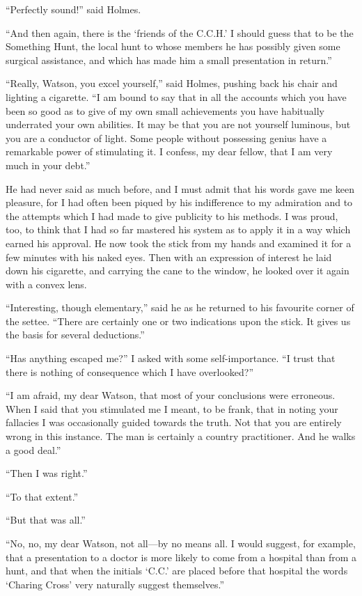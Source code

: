 \documentclass[paper=5.5in:8.5in,BCOR=7mm,twoside,DIV=calc,12pt,usegeometry,openany,chapterprefix,endperiod]{scrbook} %
\begin{document}
\enquote{Perfectly sound!} said Holmes.

\enquote{And then again, there is the \enquote{friends of the C.C.H.} I should guess that to be the Something Hunt, the local hunt to whose members he has possibly given some surgical assistance, and which has made him a small presentation in return.}

\enquote{Really, Watson, you excel yourself,} said Holmes, pushing back his chair and lighting a cigarette. \enquote{I am bound to say that in all the accounts which you have been so good as to give of my own small achievements you have habitually underrated your own abilities. It may be that you are not yourself luminous, but you are a conductor of light. Some people without possessing genius have a remarkable power of stimulating it. I confess, my dear fellow, that I am very much in your debt.}

He had never said as much before, and I must admit that his words gave me keen pleasure, for I had often been piqued by his indifference to my admiration and to the attempts which I had made to give publicity to his methods. I was proud, too, to think that I had so far mastered his system as to apply it in a way which earned his approval. He now took the stick from my hands and examined it for a few minutes with his naked eyes. Then with an expression of interest he laid down his cigarette, and carrying the cane to the window, he looked over it again with a convex lens.

\enquote{Interesting, though elementary,} said he as he returned to his favourite corner of the settee. \enquote{There are certainly one or two indications upon the stick. It gives us the basis for several deductions.}

\enquote{Has anything escaped me?} I asked with some self-importance. \enquote{I trust that there is nothing of consequence which I have overlooked?}

\enquote{I am afraid, my dear Watson, that most of your conclusions were erroneous. When I said that you stimulated me I meant, to be frank, that in noting your fallacies I was occasionally guided towards the truth. Not that you are entirely wrong in this instance. The man is certainly a country practitioner. And he walks a good deal.}

\enquote{Then I was right.}

\enquote{To that extent.}

\enquote{But that was all.}

\enquote{No, no, my dear Watson, not all\nobreakdash---by no means all. I would suggest, for example, that a presentation to a doctor is more likely to come from a hospital than from a hunt, and that when the initials \enquote{C.C.} are placed before that hospital the words \enquote{Charing Cross} very naturally suggest themselves.}
\end{document}
